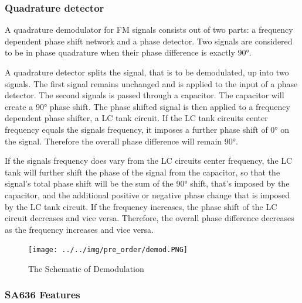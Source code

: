 \documentclass[]{article}
\begin{document}
        \subsubsection{Quadrature detector}
            A quadrature demodulator for FM signals consists out of two parts: a
            frequency dependent phase shift network and a phase detector. Two
            signals are considered to be in phase quadrature when their phase
            difference is exactly 90°.\par
            A quadrature detector splits the signal, that is to be demodulated,
            up into two signals. The first signal remains unchanged and is
            applied to the input of a phase detector. The second signals is
            passed through a capacitor. The capacitor will create a 90° phase
            shift. The phase shifted signal is then applied to a frequency
            dependent phase shifter, a LC tank circuit. If the LC tank circuits
            center frequency equals the signals frequency, it imposes a further
            phase shift of 0° on the signal.  Therefore the overall phase
            difference will remain 90°.\par
            If the signals frequency does vary from the LC circuits center
            frequency, the LC tank will further shift the phase of the signal
            from the capacitor, so that the signal’s total phase shift will be
            the sum of the 90° shift, that’s imposed by the capacitor, and the
            additional positive or negative phase change that is imposed by the
            LC tank circuit. If the frequency increases, the phase shift of the
            LC circuit decreases and vice versa. Therefore, the overall phase
            difference decreases as the frequency increases and vice versa.\par

            \begin{figure}[p]
                \begin{center}
                    \texttt{[image: ../../img/pre\_order/demod.PNG]}~
                    \label{ADL5521}
                    \caption{The Schematic of Demodulation}
                \end{center}
            \end{figure}

        \subsubsection{SA636 Features}
\end{document}
